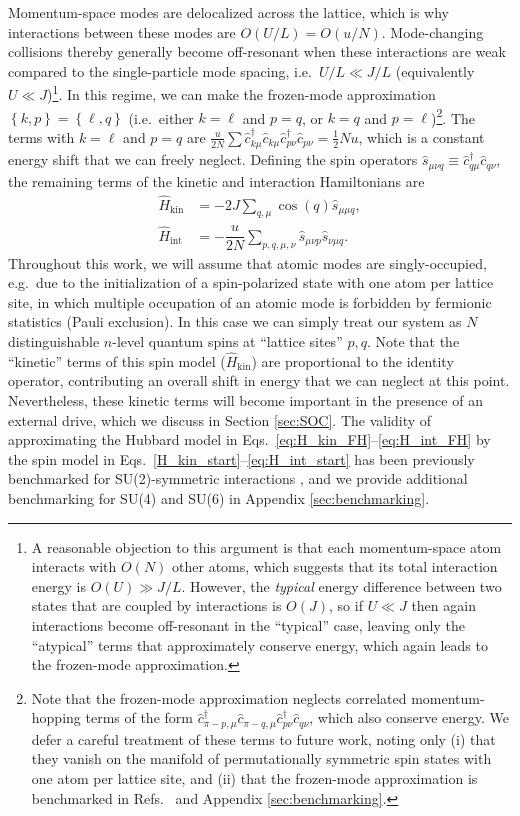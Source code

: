 \documentclass[aps,pra,nofootinbib,twocolumn,superscriptaddress]{revtex4-2}
\renewcommand{\t}{\text} %
\newcommand{\f}[2]{\dfrac{#1}{#2}} %
\newcommand{\p}[1]{\left(#1\right)} %
\renewcommand{\set}[1]{\left\{#1\right\}} %
\newcommand{\1}{\mathds{1}}
\renewcommand{\c}{\hat{c}}
\newcommand{\s}{\hat{s}}
\renewcommand{\H}{\hat{H}}
\begin{document}
Momentum-space modes are delocalized across the lattice, which is why interactions between these modes are $O(U/L)=O(u/N)$.
Mode-changing collisions thereby generally become off-resonant when these interactions are weak compared to the single-particle mode spacing, i.e.~$U/L\ll J/L$ (equivalently $U\ll J$)\footnote{
A reasonable objection to this argument is that each momentum-space atom interacts with $O(N)$ other atoms, which suggests that its total interaction energy is $O(U)\gg J/L$.
However, the \textit{typical} energy difference between two states that are coupled by interactions is $O(J)$, so if $U\ll J$ then again interactions become off-resonant in the ``typical'' case, leaving only the ``atypical'' terms that approximately conserve energy, which again leads to the frozen-mode approximation.
}.
In this regime, we can make the frozen-mode approximation $\set{k,p}=\set{\ell,q}$ (i.e.~either $k=\ell$ and $p=q$, or $k=q$ and $p=\ell$)\footnote{
Note that the frozen-mode approximation neglects correlated momentum-hopping terms of the form $\c_{\pi-p,\mu}^\dag \c_{\pi-q,\mu} \c_{p\nu}^\dag \c_{q\nu}$, which also conserve energy.
We defer a careful treatment of these terms to future work, noting only (i) that they vanish on the manifold of permutationally symmetric spin states with one atom per lattice site, and (ii) that the frozen-mode approximation is benchmarked in Refs.~\cite{he2019engineering, smale2019observation} and Appendix \ref{sec:benchmarking}.
}.
The terms with $k=\ell$ and $p=q$ are $\frac{u}{2N} \sum \c_{k\mu}^\dag \c_{k\mu} \c_{p\nu}^\dag \c_{p\nu} = \frac12 N u$, which is a constant  energy shift that we can freely neglect.
Defining the spin operators $\s_{\mu\nu q}\equiv \c_{q\mu}^\dag \c_{q\nu}$, the remaining terms of the kinetic and interaction Hamiltonians are
\begin{align}
  \H_{\t{kin}}
  &= -2J\sum_{q,\mu} \cos\p{q} \s_{\mu\mu q},
  \label{H_kin_start} \\
  \H_{\t{int}}
  &= -\f{u}{2N} \sum_{p,q,\mu,\nu} \s_{\mu\nu p} \s_{\nu\mu q}.
  \label{eq:H_int_start}
\end{align}
Throughout this work, we will assume that atomic modes are singly-occupied, e.g.~due to the initialization of a spin-polarized state with one atom per lattice site, in which multiple occupation of an atomic mode is forbidden by fermionic statistics (Pauli exclusion).
In this case we can simply treat our system as $N$ distinguishable $n$-level quantum spins at ``lattice sites'' $p,q$.
Note that the ``kinetic'' terms of this spin model ($\H_{\t{kin}}$) are proportional to the identity operator, contributing an overall shift in energy that we can neglect at this point.
Nevertheless, these kinetic terms will become important in the presence of an external drive, which we discuss in Section \ref{sec:SOC}.
The validity of approximating the Hubbard model in Eqs.~\eqref{eq:H_kin_FH}--\eqref{eq:H_int_FH} by the spin model in Eqs.~\eqref{H_kin_start}--\eqref{eq:H_int_start} has been previously benchmarked for SU(2)-symmetric interactions \cite{he2019engineering, smale2019observation}, and we provide additional benchmarking for SU(4) and SU(6) in Appendix \ref{sec:benchmarking}.
\end{document}
